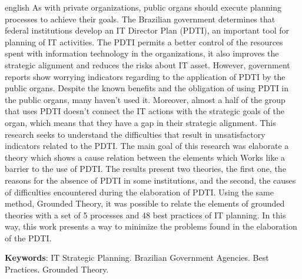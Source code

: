 \documentclass[
	12pt,				%
	openany, %
	oneside, %
	a4paper,			%
	english,			%
	french,				%
	spanish,			%
	brazil				%
	]{abntex2}
\begin{document}
\begin{resumo}[Abstract]
 \begin{otherlanguage*}{english}
As with private organizations, public organs should execute planning processes to achieve their goals. The Brazilian government determines that federal institutions develop an IT Director Plan (PDTI), an important tool for planning of IT activities. The PDTI permits a better control of the resources spent with information technology in the organizations, it also improves the strategic alignment and reduces the risks about IT asset. However, government reports show worrying indicators regarding to the application of PDTI by the public organs. Despite the known benefits and the obligation of using PDTI in the public organs, many haven’t used it. Moreover, almost a half of the group that uses PDTI doesn’t connect the IT actions with the strategic goals of the organ, which means that they have a gap in their strategic alignment. This research seeks to understand the difficulties that result in unsatisfactory indicators related to the PDTI. The main goal of this research was elaborate a theory which shows a cause relation between the elements which Works like a barrier to the use of PDTI. The results present two theories, the first one, the reasons for the absence of PDTI in some institutions, and the second, the causes of difficulties encountered during the elaboration of PDTI. Using the same method, Grounded Theory, it was possible to relate the elements of grounded theories with a set of 5 processes and 48 best practices of IT planning. In this way, this work presents a way to minimize the problems found in the elaboration of the PDTI.



   \vspace{\onelineskip}
 
   \noindent 
   \textbf{Keywords}: IT Strategic Planning. Brazilian Government Agencies. Best Practices. Grounded Theory.
 \end{otherlanguage*}
\end{resumo}
\end{document}
